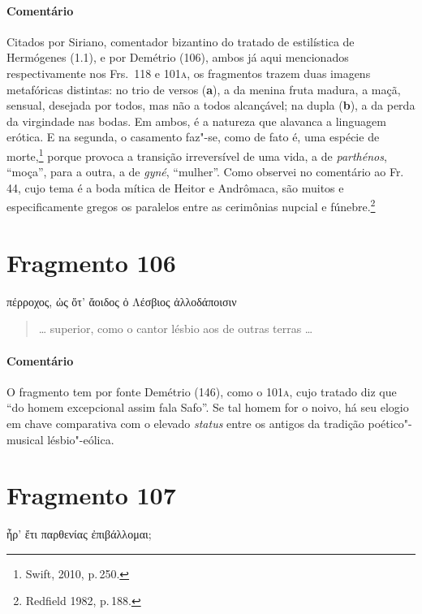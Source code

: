 {\paragraph{Comentário} Citados por Siriano, comentador bizantino do tratado de estilística de
Hermógenes (1.1), e por Demétrio (106), ambos já aqui mencionados respectivamente nos Frs.~118 e 101\textsc{a}, os fragmentos trazem duas imagens metafóricas distintas: no trio de versos (\textbf{a}), a da menina fruta madura, a maçã, sensual, desejada por todos,
mas não a todos alcançável; na dupla (\textbf{b}), a da perda da virgindade nas bodas.
Em ambos, é a natureza que alavanca a linguagem erótica.
E na segunda, o casamento faz"-se, como de fato é, uma espécie de morte,\footnote{Swift, 2010, p.\,250.} porque provoca a transição irreversível de uma vida, a de \textit{parthénos}, ``moça'', para a outra, a de \textit{gyné}, ``mulher''. Como observei no comentário ao Fr.\,44, cujo tema é a boda mítica de Heitor e Andrômaca, são muitos e especificamente gregos os paralelos entre as cerimônias nupcial e fúnebre.\footnote{Redfield 1982, p.\,188.}


\pagebreak
\section{Fragmento 106}

\begin{gkverse}
πέρροχος, ὠς ὄτ’ ἄοιδος ὀ Λέσβιος ἀλλοδάποισιν
\end{gkverse}

\begin{verse}
\ldots{} superior, como o cantor lésbio aos de outras terras \ldots{}
\end{verse}

\medskip

{\paragraph{Comentário} O fragmento tem por fonte Demétrio (146), como o 101\textsc{a}, cujo tratado diz que
``do homem excepcional assim fala Safo''. Se tal homem for o
noivo, há seu elogio em chave comparativa com o elevado \textit{status}
entre os antigos da tradição poético"-musical lésbio"-eólica.}


\section{Fragmento 107}

\begin{gkverse}
ἦρ’ ἔτι παρθενίας ἐπιβάλλομαι;
\end{gkverse}

}
